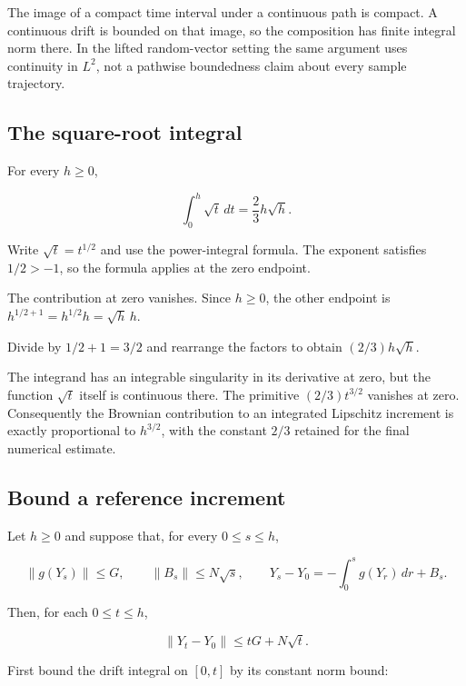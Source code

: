 \documentclass[11pt,a4paper]{report}
\begin{document}
The image of a compact time interval under a continuous path is compact. A continuous drift is bounded on that image, so the composition has finite integral norm there. In the lifted random-vector setting the same argument uses continuity in \(L^2\), not a pathwise boundedness claim about every sample trajectory.

\subsection{\texorpdfstring{The square-root integral}{The square-root integral}}
\label{report-step-UnadjustedLangevin-LocalError-lean-5}


For every \(h\ge0\),

\[\int_0^h\sqrt t\,dt=\frac23h\sqrt h.\]

Write \(\sqrt t=t^{1/2}\) and use the power-integral formula. The exponent satisfies \(1/2>-1\), so the formula applies at the zero endpoint.



The contribution at zero vanishes. Since \(h\ge0\), the other endpoint is \(h^{1/2+1}=h^{1/2}h=\sqrt h\,h\).



Divide by \(1/2+1=3/2\) and rearrange the factors to obtain \((2/3)h\sqrt h\).



The integrand has an integrable singularity in its derivative at zero, but the function \(\sqrt t\) itself is continuous there. The primitive \((2/3)t^{3/2}\) vanishes at zero. Consequently the Brownian contribution to an integrated Lipschitz increment is exactly proportional to \(h^{3/2}\), with the constant \(2/3\) retained for the final numerical estimate.

\subsection{\texorpdfstring{Bound a reference increment}{Bound a reference increment}}
\label{report-step-UnadjustedLangevin-LocalError-lean-6}


Let \(h\ge0\) and suppose that, for every \(0\le s\le h\),

\[\|g(Y_s)\|\le G,\qquad \|B_s\|\le N\sqrt s,\qquad Y_s-Y_0=-\int_0^s g(Y_r)\,dr+B_s.\]

Then, for each \(0\le t\le h\),

\[\|Y_t-Y_0\|\le tG+N\sqrt t.\]

First bound the drift integral on \([0,t]\) by its constant norm bound:
\end{document}
